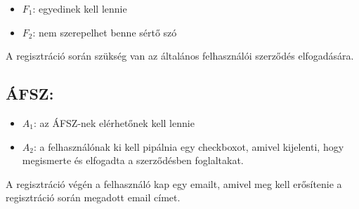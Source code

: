 \begin{itemize}
    \item $F_1$: egyedinek kell lennie
    \item $F_2$: nem szerepelhet benne sértő szó
\end{itemize}

A regisztráció során szükség van az általános felhasználói szerződés elfogadására.

\subsection{ÁFSZ:}

\begin{itemize}
    \item $A_1$: az ÁFSZ-nek elérhetőnek kell lennie
    \item $A_2$: a felhasználónak ki kell pipálnia egy checkboxot, amivel kijelenti, hogy megismerte és elfogadta a szerződésben foglaltakat.
\end{itemize}

A regisztráció végén a felhasználó kap egy emailt, amivel meg kell erősítenie a regisztráció során megadott email címet.

